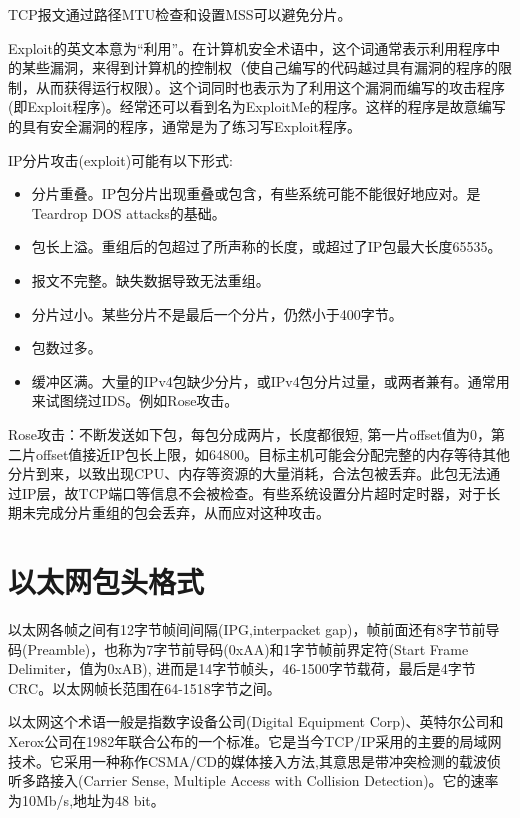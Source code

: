 TCP报文通过路径MTU检查和设置MSS可以避免分片。

Exploit的英文本意为“利用”。在计算机安全术语中，这个词通常表示利用程序中的某些漏洞，来得到计算机的控制权（使自己编写的代码越过具有漏洞的程序的限制，从而获得运行权限）。这个词同时也表示为了利用这个漏洞而编写的攻击程序(即Exploit程序)。经常还可以看到名为ExploitMe的程序。这样的程序是故意编写的具有安全漏洞的程序，通常是为了练习写Exploit程序。

IP分片攻击(exploit)可能有以下形式\cite{wikipedia}:
\begin{itemize}
    \item 分片重叠。IP包分片出现重叠或包含，有些系统可能不能很好地应对。是Teardrop DOS attacks的基础。
    \item 包长上溢。重组后的包超过了所声称的长度，或超过了IP包最大长度65535。
    \item 报文不完整。缺失数据导致无法重组。
    \item 分片过小。某些分片不是最后一个分片，仍然小于400字节。
    \item 包数过多。
    \item 缓冲区满。大量的IPv4包缺少分片，或IPv4包分片过量，或两者兼有。通常用来试图绕过IDS。例如Rose攻击。
\end{itemize}

Rose攻击：不断发送如下包，每包分成两片，长度都很短, 第一片offset值为0，第二片offset值接近IP包长上限，如64800。目标主机可能会分配完整的内存等待其他分片到来，以致出现CPU、内存等资源的大量消耗，合法包被丢弃。此包无法通过IP层，故TCP端口等信息不会被检查。有些系统设置分片超时定时器，对于长期未完成分片重组的包会丢弃，从而应对这种攻击。






\section{以太网包头格式}
以太网各帧之间有12字节帧间间隔(IPG,interpacket gap)，帧前面还有8字节前导码(Preamble)，也称为7字节前导码(0xAA)和1字节帧前界定符(Start Frame Delimiter，值为0xAB), 进而是14字节帧头，46-1500字节载荷，最后是4字节CRC。以太网帧长范围在64-1518字节之间。

以太网这个术语一般是指数字设备公司(Digital Equipment Corp)、英特尔公司和Xerox公司在1982年联合公布的一个标准。它是当今TCP/IP采用的主要的局域网技术。它采用一种称作CSMA/CD的媒体接入方法,其意思是带冲突检测的载波侦听多路接入(Carrier Sense, Multiple Access with Collision Detection)。它的速率为10Mb/s,地址为48 bit。

